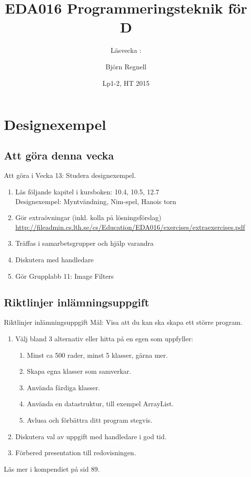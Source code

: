 \documentclass{lecturenotes}
\title[Föreläsningsanteckningar EDA016, 2015]{EDA016 Programmeringsteknik för D}
\subtitle{Läsvecka \vecka: \tema}
\author{Björn Regnell}
\institute{Datavetenskap, LTH}
\date{Lp1-2, HT 2015}
\renewcommand{\vecka}{13}
\newcommand{\tema}{Designexempel}
\begin{document}
\frame{\titlepage}
\setnextsection{\vecka}
\section[Vecka \vecka: \tema]{\tema}
\frame{\tableofcontents}

\subsection{Att göra denna vecka}
\begin{Slide}{Att göra i Vecka \vecka: Studera designexempel.}
\begin{enumerate}
\item Läs följande kapitel i kursboken:  10.4, 10.5, 12.7 \\  
  Designexempel: Myntvändning, Nim-spel, Hanois torn
\item Gör extraövningar (inkl. kolla på lösningsförslag) \\ {\scriptsize \url{http://fileadmin.cs.lth.se/cs/Education/EDA016/exercises/extraexercises.pdf}}
\item Träffas i samarbetsgrupper och hjälp varandra 
\item Diskutera  med handledare 
\item Gör Grupplabb 11: Image Filters
\end{enumerate}
\end{Slide}

\subsection{Riktlinjer inlämningsuppgift}
\begin{Slide}{Riktlinjer inlämningsuppgift}
Mål: Visa att du kan ska skapa ett större program. 
\begin{enumerate}

\item Välj bland 3 alternativ eller hitta på en egen som uppfyller: 
\begin{enumerate}
\item Minst ca 500 rader, minst 5 klasser, gärna mer.
\item Skapa egna klasser som samverkar.
\item Använda färdiga klasser.
\item Använda en datastruktur, till exempel ArrayList.
\item Avlusa och förbättra ditt program stegvis.
\end{enumerate}

\item Diskutera val av uppgift med handledare i god tid.

\item Förbered presentation till redovisningen.
\end{enumerate}
Läs mer i kompendiet på sid 89.
\end{Slide}
\end{document}
